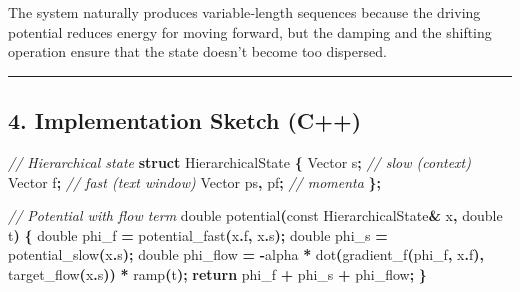 \documentclass[
  11pt,
  a4paper,
]{article}
\newenvironment{Shaded}{\begin{snugshade}}{\end{snugshade}}
\newcommand{\AttributeTok}[1]{\textcolor[rgb]{0.13,0.29,0.53}{#1}}
\newcommand{\CommentTok}[1]{\textcolor[rgb]{0.56,0.35,0.01}{\textit{#1}}}
\newcommand{\ControlFlowTok}[1]{\textcolor[rgb]{0.13,0.29,0.53}{\textbf{#1}}}
\newcommand{\DataTypeTok}[1]{\textcolor[rgb]{0.13,0.29,0.53}{#1}}
\newcommand{\KeywordTok}[1]{\textcolor[rgb]{0.13,0.29,0.53}{\textbf{#1}}}
\newcommand{\NormalTok}[1]{#1}
\newcommand{\OperatorTok}[1]{\textcolor[rgb]{0.81,0.36,0.00}{\textbf{#1}}}
\begin{document}
The system naturally produces variable‑length sequences because the
driving potential reduces energy for moving forward, but the damping and
the shifting operation ensure that the state doesn't become too
dispersed.

\begin{center}\rule{0.5\linewidth}{0.5pt}\end{center}

\subsection{4. Implementation Sketch
(C++)}\label{implementation-sketch-c}

\begin{Shaded}
\begin{Highlighting}[]
\CommentTok{// Hierarchical state}
\KeywordTok{struct}\NormalTok{ HierarchicalState }\OperatorTok{\{}
\NormalTok{    Vector s}\OperatorTok{;} \CommentTok{// slow (context)}
\NormalTok{    Vector f}\OperatorTok{;} \CommentTok{// fast (text window)}
\NormalTok{    Vector ps}\OperatorTok{,}\NormalTok{ pf}\OperatorTok{;} \CommentTok{// momenta}
\OperatorTok{\};}

\CommentTok{// Potential with flow term}
\DataTypeTok{double}\NormalTok{ potential}\OperatorTok{(}\AttributeTok{const}\NormalTok{ HierarchicalState}\OperatorTok{\&}\NormalTok{ x}\OperatorTok{,} \DataTypeTok{double}\NormalTok{ t}\OperatorTok{)} \OperatorTok{\{}
    \DataTypeTok{double}\NormalTok{ phi\_f }\OperatorTok{=}\NormalTok{ potential\_fast}\OperatorTok{(}\NormalTok{x}\OperatorTok{.}\NormalTok{f}\OperatorTok{,}\NormalTok{ x}\OperatorTok{.}\NormalTok{s}\OperatorTok{);}
    \DataTypeTok{double}\NormalTok{ phi\_s }\OperatorTok{=}\NormalTok{ potential\_slow}\OperatorTok{(}\NormalTok{x}\OperatorTok{.}\NormalTok{s}\OperatorTok{);}
    \DataTypeTok{double}\NormalTok{ phi\_flow }\OperatorTok{=} \OperatorTok{{-}}\NormalTok{alpha }\OperatorTok{*}\NormalTok{ dot}\OperatorTok{(}\NormalTok{gradient\_f}\OperatorTok{(}\NormalTok{phi\_f}\OperatorTok{,}\NormalTok{ x}\OperatorTok{.}\NormalTok{f}\OperatorTok{),}\NormalTok{ target\_flow}\OperatorTok{(}\NormalTok{x}\OperatorTok{.}\NormalTok{s}\OperatorTok{))} \OperatorTok{*}\NormalTok{ ramp}\OperatorTok{(}\NormalTok{t}\OperatorTok{);}
    \ControlFlowTok{return}\NormalTok{ phi\_f }\OperatorTok{+}\NormalTok{ phi\_s }\OperatorTok{+}\NormalTok{ phi\_flow}\OperatorTok{;}
\OperatorTok{\}}


\end{Highlighting}
\end{Shaded}
\end{document}
